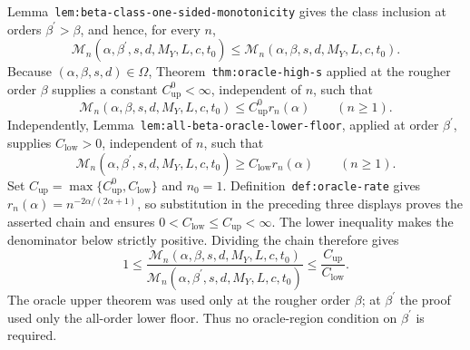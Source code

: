 Lemma~\texttt{lem:beta-class-one-sided-monotonicity} gives the class inclusion at orders \(\beta^{\prime}>\beta\), and hence, for every \(n\),
\[
\mathcal M_n(\alpha,\beta^{\prime},s,d,M_Y,L,c,t_0)
\le
\mathcal M_n(\alpha,\beta,s,d,M_Y,L,c,t_0).
\]
Because \((\alpha,\beta,s,d)\in\Omega\), Theorem~\texttt{thm:oracle-high-s} applied at the rougher order \(\beta\) supplies a constant \(C_{\mathrm{up}}^0<\infty\), independent of \(n\), such that
\[
\mathcal M_n(\alpha,\beta,s,d,M_Y,L,c,t_0)
\le C_{\mathrm{up}}^0r_n(\alpha)
\qquad(n\ge1).
\]
Independently, Lemma~\texttt{lem:all-beta-oracle-lower-floor}, applied at order \(\beta^{\prime}\), supplies \(C_{\mathrm{low}}>0\), independent of \(n\), such that
\[
\mathcal M_n(\alpha,\beta^{\prime},s,d,M_Y,L,c,t_0)
\ge C_{\mathrm{low}}r_n(\alpha)
\qquad(n\ge1).
\]
Set \(C_{\mathrm{up}}=\max\{C_{\mathrm{up}}^0,C_{\mathrm{low}}\}\) and \(n_0=1\). Definition~\texttt{def:oracle-rate} gives \(r_n(\alpha)=n^{-2\alpha/(2\alpha+1)}\), so substitution in the preceding three displays proves the asserted chain and ensures \(0<C_{\mathrm{low}}\le C_{\mathrm{up}}<\infty\). The lower inequality makes the denominator below strictly positive. Dividing the chain therefore gives
\[
1\le
\frac{\mathcal M_n(\alpha,\beta,s,d,M_Y,L,c,t_0)}
{\mathcal M_n(\alpha,\beta^{\prime},s,d,M_Y,L,c,t_0)}
\le\frac{C_{\mathrm{up}}}{C_{\mathrm{low}}}.
\]
The oracle upper theorem was used only at the rougher order \(\beta\); at \(\beta^{\prime}\) the proof used only the all-order lower floor. Thus no oracle-region condition on \(\beta^{\prime}\) is required.